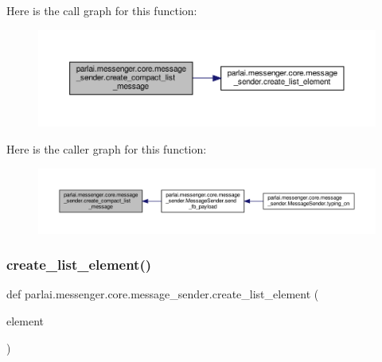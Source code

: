 Here is the call graph for this function\+:
\nopagebreak
\begin{figure}[H]
\begin{center}
\leavevmode
\includegraphics[width=350pt]{namespaceparlai_1_1messenger_1_1core_1_1message__sender_a4359c421913c537e0003032b1d1b79b5_cgraph}
\end{center}
\end{figure}
Here is the caller graph for this function\+:
\nopagebreak
\begin{figure}[H]
\begin{center}
\leavevmode
\includegraphics[width=350pt]{namespaceparlai_1_1messenger_1_1core_1_1message__sender_a4359c421913c537e0003032b1d1b79b5_icgraph}
\end{center}
\end{figure}
\mbox{\label{namespaceparlai_1_1messenger_1_1core_1_1message__sender_a0fb8b2849a9c5d3e0db470a399358b5b}} 
\subsubsection{\texorpdfstring{create\+\_\+list\+\_\+element()}{create\_list\_element()}}
{\footnotesize\ttfamily def parlai.\+messenger.\+core.\+message\+\_\+sender.\+create\+\_\+list\+\_\+element (\begin{DoxyParamCaption}\item[{}]{element }\end{DoxyParamCaption})}




